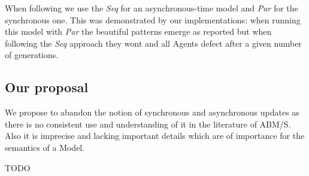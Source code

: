 When following \cite{huberman_evolutionary_1993} we use the \textit{Seq} for an asynchronous-time model and \textit{Par} for the synchronous one. This was demonstrated by our implementations: when running this model with \textit{Par} the beautiful patterns emerge as reported but when following the \textit{Seq} approach they wont and all Agents defect after a given number of generations.

\subsection{Our proposal}
We propose to abandon the notion of synchronous and asynchronous updates as there is no consistent use and understanding of it in the literature of ABM/S. Also it is imprecise and lacking important details which are of importance for the semantics of a Model. 

TODO